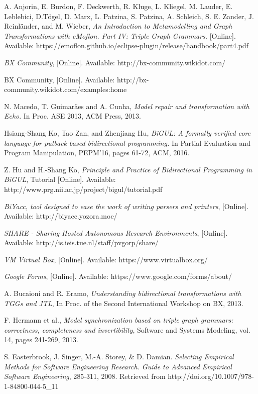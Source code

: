 \begin{thebibliography}{1}
	 A. Anjorin, E. Burdon, F. Deckwerth, R. Kluge, L. Kliegel, M. Lauder, E. Leblebici, D.T\"ogel, D. Marx, L. Patzina, S. Patzina, A. Schleich, S. E. Zander, J. Reinl\"ander, and M. Wieber, {\em An Introduction to Metamodelling and Graph Transformations with eMoflon. Part IV: Triple Graph Grammars.} [Online]. Available: 
	https://emoflon.github.io/eclipse-plugin/release/handbook/part4.pdf
	
	 {\em BX Community}, [Online]. Available: http://bx-community.wikidot.com/
	
	 BX Community, [Online]. Available: http://bx-community.wikidot.com/examples:home
	
	 N. Macedo, T. Guimar\"aes and A. Cunha, {\em Model repair and transformation with Echo}. In Proc. ASE 2013, ACM Press, 2013.
	
	 Hsiang-Shang Ko, Tao Zan, and Zhenjiang Hu, {\em BiGUL: A formally verified core language for putback-based bidirectional programming.} In Partial Evaluation and Program Manipulation, PEPM'16, pages 61-72, ACM, 2016.
	
	 Z. Hu and H.-Shang Ko,  {\em Principle and Practice of Bidirectional Programming in BiGUL}, Tutorial [Online]. Available: http://www.prg.nii.ac.jp/project/bigul/tutorial.pdf
	
	 {\em BiYacc, tool designed to ease the work of writing parsers and printers}, [Online]. Available: http://biyacc.yozora.moe/
	
	 {\em SHARE - Sharing Hosted Autonomous Research Environments}, [Online]. Available: http://is.ieis.tue.nl/staff/pvgorp/share/
	
	 {\em VM Virtual Box}, [Online]. Available: https://www.virtualbox.org/
	
	 {\em Google Forms}, [Online]. Available: https://www.google.com/forms/about/
	
	 A. Bucaioni and R. Eramo, {\em Understanding bidirectional transformations with TGGs and JTL}, In Proc. of the Second International Workshop on BX, 2013.
	
	 F. Hermann et al., {\em Model synchronization based on triple graph grammars: correctness, completeness and invertibility}, Software and Systems Modeling, vol. 14, pages 241-269, 2013.
	
	 S. Easterbrook, J. Singer, M.-A. Storey, \& D. Damian. {\em Selecting Empirical Methods for Software Engineering Research. Guide to Advanced Empirical Software Engineering}, 285-311, 2008. Retrieved from http://doi.org/10.1007/978-1-84800-044-5\_11
	

\end{thebibliography}
